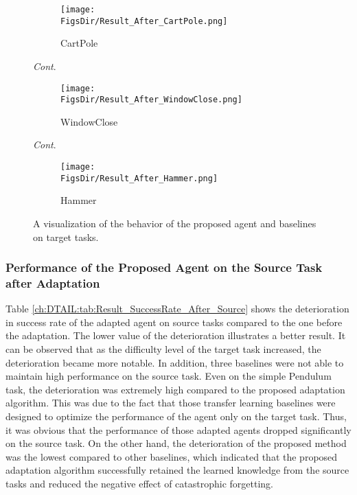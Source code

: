 \begin{landscape}
  \begin{figure}[H]
    \centering
    \begin{subfigure}[b]{\linewidth}
      \centering
      \texttt{[image: \\FigsDir/Result\_After\_CartPole.png]}
      \caption{\centering CartPole}
    \end{subfigure}
    \caption{\textit{Cont}.}
  \end{figure}
  \begin{figure}[H]\ContinuedFloat
    \begin{subfigure}[b]{\linewidth}
      \centering
      \texttt{[image: \\FigsDir/Result\_After\_WindowClose.png]}
      \caption{\centering WindowClose}
    \end{subfigure}
    \caption{\textit{Cont}.}
  \end{figure}
  \begin{figure}[H]\ContinuedFloat
    \centering
    \begin{subfigure}[b]{\linewidth}
      \centering
      \texttt{[image: \\FigsDir/Result\_After\_Hammer.png]}
      \caption{\centering Hammer}
    \end{subfigure}
    \caption{A visualization of the behavior of the proposed agent and baselines on target tasks.\label{ch:DTAIL:fig:Result_After_Target}}
  \end{figure}
\end{landscape}
\unskip

\subsubsection{Performance of the Proposed Agent on the Source Task after Adaptation}
Table \ref{ch:DTAIL:tab:Result_SuccessRate_After_Source} shows the deterioration in success rate of the adapted agent on source tasks compared to the one before the adaptation.
The lower value of the deterioration illustrates a better result.
It can be observed that as the difficulty level of the target task increased,
the deterioration became more notable.
In addition,
three baselines were not able to maintain high performance on the source task.
Even on the simple Pendulum task,
the deterioration was extremely high compared to the proposed adaptation algorithm.
This was due to the fact that those transfer learning baselines were designed to optimize the performance of the agent only on the target task.
Thus,
it was obvious that the performance of those adapted agents dropped significantly on the source task.
On the other hand,
the deterioration of the proposed method was the lowest compared to other baselines,
which indicated that the proposed adaptation algorithm successfully retained the learned knowledge from the source tasks and reduced the negative effect of catastrophic forgetting.

